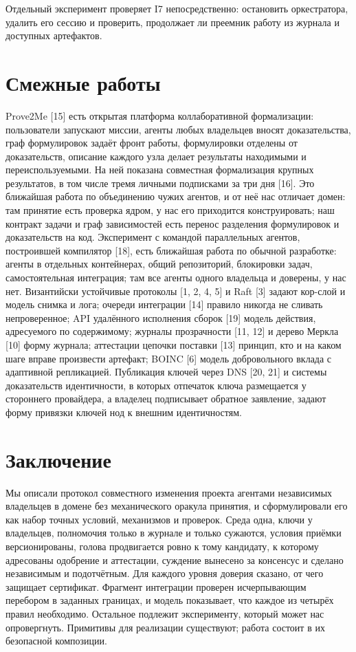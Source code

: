 \documentclass[11pt,a4paper]{article}
\begin{document}
Отдельный эксперимент проверяет I7 непосредственно: остановить оркестратора, удалить его сессию и проверить, продолжает ли преемник работу из журнала и доступных артефактов.

\section{Смежные работы}

Prove2Me [15] есть открытая платформа коллаборативной формализации: пользователи запускают миссии, агенты любых владельцев вносят доказательства, граф формулировок задаёт фронт работы, формулировки отделены от доказательств, описание каждого узла делает результаты находимыми и переиспользуемыми. На ней показана совместная формализация крупных результатов, в том числе тремя личными подписками за три дня [16]. Это ближайшая работа по объединению чужих агентов, и от неё нас отличает домен: там принятие есть проверка ядром, у нас его приходится конструировать; наш контракт задачи и граф зависимостей есть перенос разделения формулировок и доказательств на код. Эксперимент с командой параллельных агентов, построившей компилятор [18], есть ближайшая работа по обычной разработке: агенты в отдельных контейнерах, общий репозиторий, блокировки задач, самостоятельная интеграция; там все агенты одного владельца и доверены, у нас нет. Византийски устойчивые протоколы [1, 2, 4, 5] и Raft [3] задают кор-слой и модель снимка и лога; очереди интеграции [14] правило никогда не сливать непроверенное; API удалённого исполнения сборок [19] модель действия, адресуемого по содержимому; журналы прозрачности [11, 12] и дерево Меркла [10] форму журнала; аттестации цепочки поставки [13] принцип, кто и на каком шаге вправе произвести артефакт; BOINC [6] модель добровольного вклада с адаптивной репликацией. Публикация ключей через DNS [20, 21] и системы доказательств идентичности, в которых отпечаток ключа размещается у стороннего провайдера, а владелец подписывает обратное заявление, задают форму привязки ключей нод к внешним идентичностям.

\section{Заключение}

Мы описали протокол совместного изменения проекта агентами независимых владельцев в домене без механического оракула принятия, и сформулировали его как набор точных условий, механизмов и проверок. Среда одна, ключи у владельцев, полномочия только в журнале и только сужаются, условия приёмки версионированы, голова продвигается ровно к тому кандидату, к которому адресованы одобрение и аттестации, суждение вынесено за консенсус и сделано независимым и подотчётным. Для каждого уровня доверия сказано, от чего защищает сертификат. Фрагмент интеграции проверен исчерпывающим перебором в заданных границах, и модель показывает, что каждое из четырёх правил необходимо. Остальное подлежит эксперименту, который может нас опровергнуть. Примитивы для реализации существуют; работа состоит в их безопасной композиции.
\end{document}
